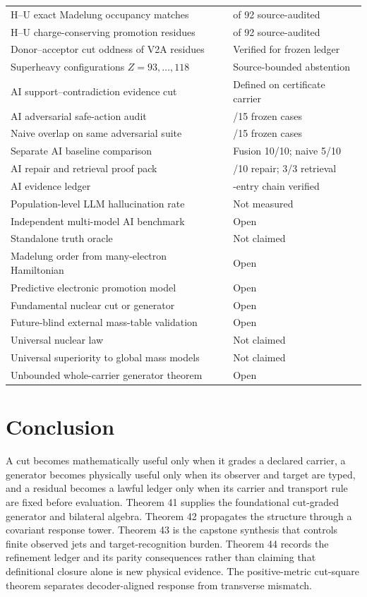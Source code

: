 \begin{longtable}{p{}>{\raggedright\arraybackslash}p{}}
H--U exact Madelung occupancy matches & 75 of 92 source-audited\\
H--U charge-conserving promotion residues & 17 of 92 source-audited\\
Donor--acceptor cut oddness of V2A residues & Verified for frozen ledger\\
Superheavy configurations $Z=93,\ldots,118$ & Source-bounded abstention\\
AI support--contradiction evidence cut & Defined on certificate carrier\\
AI adversarial safe-action audit & 15/15 frozen cases\\
Naive overlap on same adversarial suite & 5/15 frozen cases\\
Separate AI baseline comparison & Fusion 10/10; naive 5/10\\
AI repair and retrieval proof pack & 10/10 repair; 3/3 retrieval\\
AI evidence ledger & 16-entry chain verified\\
Population-level LLM hallucination rate & Not measured\\
Independent multi-model AI benchmark & Open\\
Standalone truth oracle & Not claimed\\
Madelung order from many-electron Hamiltonian & Open\\
Predictive electronic promotion model & Open\\
Fundamental nuclear cut or generator & Open\\
Future-blind external mass-table validation & Open\\
Universal nuclear law & Not claimed\\
Universal superiority to global mass models & Not claimed\\
Unbounded whole-carrier generator theorem & Open\\
\bottomrule
\end{longtable}

\section{Conclusion}

A cut becomes mathematically useful only when it grades a declared carrier, a generator becomes physically useful only when its observer and target are typed, and a residual becomes a lawful ledger only when its carrier and transport rule are fixed before evaluation. Theorem 41 supplies the foundational cut-graded generator and bilateral algebra. Theorem 42 propagates the structure through a covariant response tower. Theorem 43 is the capstone synthesis that controls finite observed jets and target-recognition burden. Theorem 44 records the refinement ledger and its parity consequences rather than claiming that definitional closure alone is new physical evidence. The positive-metric cut-square theorem separates decoder-aligned response from transverse mismatch.

